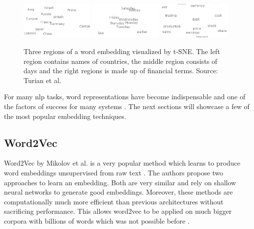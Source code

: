 \begin{figure}[ht]
	\centering
	\includegraphics[width=0.32\textwidth]{figures/03_theory/03_wordEmbeddings1}
	\includegraphics[width=0.32\textwidth]{figures/03_theory/03_wordEmbeddings2}
	\includegraphics[width=0.32\textwidth]{figures/03_theory/03_wordEmbeddings3}
	\caption[Three regions of a word embedding visualized by t-SNE. Source: Turian et al. \cite{Turian2010} - Source for full image \url{http://metaoptimize.s3.amazonaws.com/cw-embeddings-ACL2010/embeddings-mostcommon.EMBEDDING_SIZE=50.png}]{Three regions of a word embedding visualized by t-SNE. The left region contains names of countries, the middle region consists of days and the right regions is made up of financial terms. Source: Turian et al. \cite{Turian2010}\protect\footnotemark}
	\label{fig:03_WordEmbeddings}
\end{figure}

For many \gls{nlp} tasks, word representations have become indispensable and one of the factors of success for many systems \cite{Luong2013}. The next sections will showcase a few of the most popular embedding techniques.

\subsection{Word2Vec}
\label{sec:03_word2vec}

Word2Vec by Mikolov et al. is a very popular method which learns to produce word embeddings unsupervised from raw text \cite{Mikolov2013}. The authors propose two approaches to learn an embedding. Both are very similar and rely on shallow neural networks to generate good embeddings. Moreover, these methods are computationally much more efficient than previous architectures without sacrificing performance. This allows word2vec to be applied on much bigger corpora with billions of words which was not possible before \cite{Mikolov2013c}.


